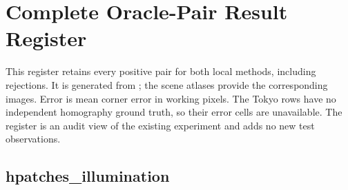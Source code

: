 \chapter{Complete Oracle-Pair Result Register}\label{app:pair-register}
This register retains every positive pair for both local methods, including rejections. It is generated from ; the scene atlases provide the corresponding images. Error is mean corner error in working pixels. The Tokyo rows have no independent homography ground truth, so their error cells are unavailable. The register is an audit view of the existing experiment and adds no new test observations.
\section{hpatches\_illumination}
\begingroup\scriptsize\setlength{\tabcolsep}{3pt}
